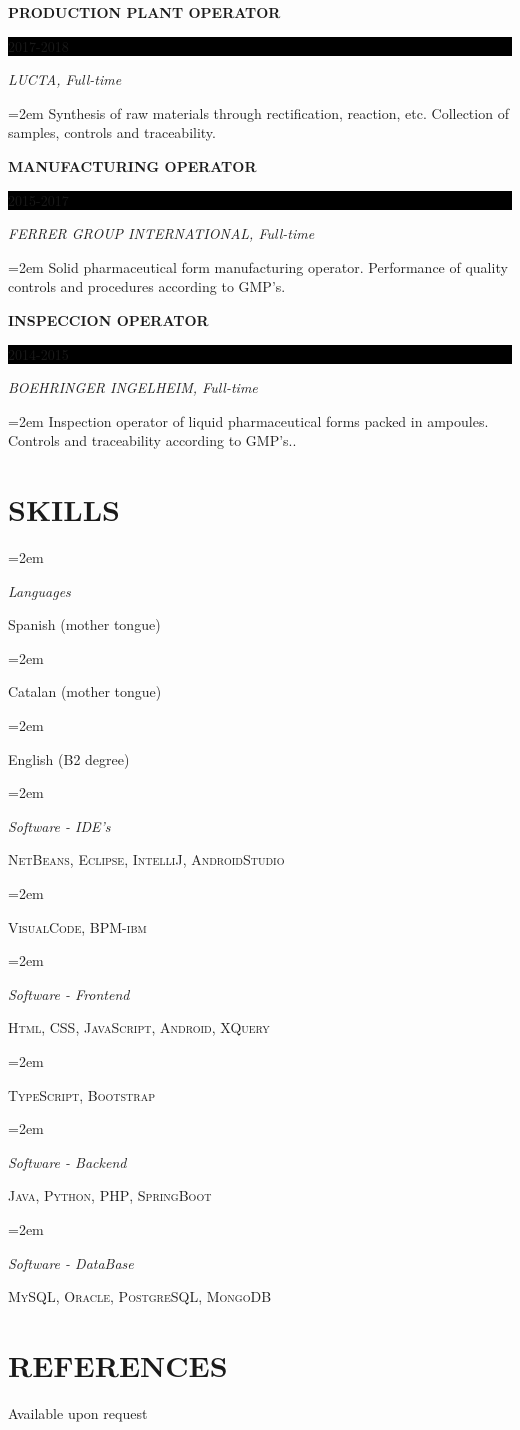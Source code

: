 \documentclass[paper=a4,fontsize=11pt]{scrartcl} %
\newlength{\spacebox}
\newcommand{\sepspace}{\vspace*{1em}}		%
\newcommand{\NewPart}[1]{\section*{\uppercase{#1}}}
\newcommand{\PersonalEntry}[2]{
		\noindent\hangindent=2em\hangafter=0 %
		\parbox{\spacebox}{        %
		\textit{#1}}		       %
		\hspace{1.5em} #2 \par}    %
\newcommand{\SkillsEntry}[2]{      %
		\noindent\hangindent=2em\hangafter=0 %
		\parbox{\spacebox}{        %
		\textit{#1}}			   %
		\hspace{1.5em} #2 \par}    %
\newcommand{\EducationEntry}[4]{
		\noindent \textbf{#1} \hfill      %
		\colorbox{Black}{%
			\parbox{6em}{%
			\hfill\color{White}#2}} \par  %
		\noindent \textit{#3} \par        %
		\noindent\hangindent=2em\hangafter=0 \small #4 %
		\normalsize \par}
\begin{document}
\EducationEntry{PRODUCTION PLANT OPERATOR}{2017-2018}{LUCTA, Full-time}{Synthesis of raw materials through rectification, reaction, etc. Collection of samples, controls and traceability.}

\newpage
\EducationEntry{MANUFACTURING OPERATOR}{2015-2017}{FERRER GROUP INTERNATIONAL, Full-time}{Solid pharmaceutical form manufacturing operator. Performance of quality controls and procedures according to GMP's.}
\sepspace


\EducationEntry{INSPECCION OPERATOR}{2014-2015}{BOEHRINGER INGELHEIM, Full-time}{Inspection operator of liquid pharmaceutical forms packed in ampoules. Controls and traceability according to GMP's..}
\sepspace

\NewPart{Skills}{}

\SkillsEntry{Languages}{Spanish (mother tongue)}
\SkillsEntry{}{Catalan (mother tongue)}
\SkillsEntry{}{English (B2 degree)}
\sepspace

\SkillsEntry{Software - IDE's}{\textsc{NetBeans}, \textsc{Eclipse}, \textsc{IntelliJ}, \textsc{AndroidStudio}}
\SkillsEntry{}{\textsc{VisualCode}, \textsc{BPM-ibm}}
\sepspace

\SkillsEntry{Software - Frontend}{\textsc{Html}, \textsc{CSS}, \textsc{JavaScript}, \textsc{Android}, \textsc{XQuery}}
\SkillsEntry{}{\textsc{TypeScript}, \textsc{Bootstrap}}
\sepspace

\SkillsEntry{Software - Backend}{\textsc{Java}, \textsc{Python}, \textsc{PHP}, \textsc{SpringBoot}}
\sepspace

\SkillsEntry{Software - DataBase}{\textsc{MySQL, Oracle, PostgreSQL, MongoDB}}
\sepspace


\NewPart{References}{}
Available upon request
\end{document}

